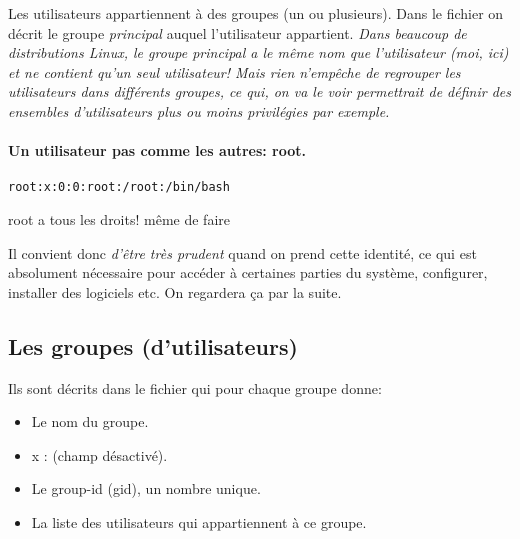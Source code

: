Les utilisateurs appartiennent à des groupes (un ou plusieurs). Dans le
fichier  on décrit le groupe \emph{principal} auquel
l'utilisateur appartient. \emph{Dans beaucoup de distributions Linux,
  le groupe principal a le même nom que l'utilisateur (moi, ici) et ne
  contient qu'un seul utilisateur! Mais rien n'empêche de regrouper
  les utilisateurs dans différents groupes, ce qui, on va le voir
  permettrait de définir des ensembles d'utilisateurs plus ou moins
  privilégies par exemple.}\smallskip


\paragraph{Un utilisateur pas comme les autres: \textsf{root}.}
\begin{center}
  \texttt{root:x:0:0:root:/root:/bin/bash}
\end{center}
\textsf{root} a tous les droits! même de faire


Il
convient donc \emph{d'être très prudent} quand on prend cette identité, ce qui
est absolument nécessaire pour accéder à certaines parties du système,
configurer, installer des logiciels etc. On regardera ça par la suite.

\subsection{Les groupes (d'utilisateurs)}
Ils sont décrits dans le fichier  qui pour chaque groupe
donne:
\begin{itemize}
\item Le nom du groupe.
\item x : (champ désactivé).
\item Le group-id (gid), un nombre unique.
\item La liste des utilisateurs qui appartiennent à ce groupe.
\end{itemize}

